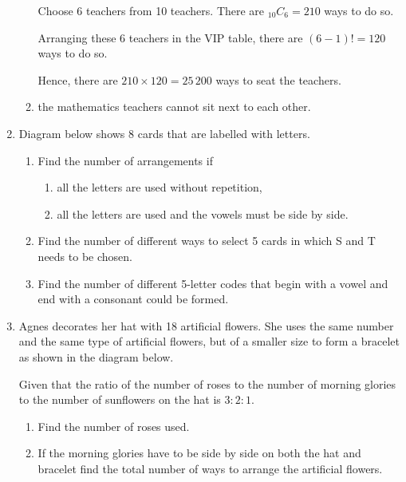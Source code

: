 \documentclass{report}
\newcommand\comb[2][^n]{{}_{#1}C_{#2}}
\def\eos{\quad\hbox{\rlap{\hbox{\vrule depth 1.5pt height 2.6mm width 0.2mm \hskip 1mm \vrule height 2.6mm width 0.2mm}}{\vbox{\hrule height 0.2mm width 1.4mm \vskip 2.8mm \hrule depth 1.5pt height -0.35mm width 1.2mm}}}}
\begin{document}
\begin{multicols*}{2}
\begin{enumerate}
\begin{enumerate}
                              Choose 6 teachers from 10 teachers. There are $\comb[10]{6} = 210$ ways to do
                              so.

                              Arranging these 6 teachers in the VIP table, there are $(6 - 1)! = 120$ ways to
                              do so.

                              Hence, there are $210 \times 120 = 25\,200$ ways to seat the teachers. $\eos$

                        \item the mathematics teachers cannot sit next to each other.
                  \end{enumerate}
            \item Diagram below shows 8 cards that are labelled with letters.
                  \begin{enumerate}
                        \item Find the number of arrangements if
                              \begin{enumerate}
                                    \item all the letters are used without repetition,
                                    \item all the letters are used and the vowels must be side by side.
                              \end{enumerate}
                        \item Find the number of different ways to select 5 cards in which S and T needs to
                              be chosen.
                        \item Find the number of different 5-letter codes that begin with a vowel and end
                              with a consonant could be formed.
                  \end{enumerate}

            \item Agnes decorates her hat with 18 artificial flowers. She uses the same number
                  and the same type of artificial flowers, but of a smaller size to form a
                  bracelet as shown in the diagram below.

                  Given that the ratio of the number of roses to the number of morning glories to
                  the number of sunflowers on the hat is $3:2:1$.
                  \begin{enumerate}
                        \item Find the number of roses used.
                        \item If the morning glories have to be side by side on both the hat and bracelet
                              find the total number of ways to arrange the artificial flowers.
                  \end{enumerate}


\end{enumerate}
\end{multicols*}
\end{document}
